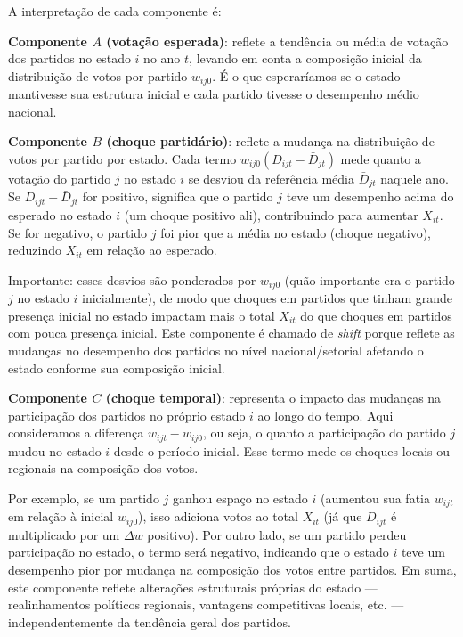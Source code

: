 \documentclass[
]{article}
\begin{document}
A interpretação de cada componente é:

\textbf{Componente \(A\) (votação esperada)}: reflete a tendência ou média de votação dos partidos no estado \(i\) no ano \(t\), levando em conta a composição inicial da distribuição de votos por partido \(w_{ij0}\). É o que esperaríamos se o estado mantivesse sua estrutura inicial e cada partido tivesse o desempenho médio nacional.

\textbf{Componente \(B\) (choque partidário)}: reflete a mudança na distribuição de votos por partido por estado. Cada termo \(w_{ij0}(D_{ijt} - \bar{D}_{jt})\) mede quanto a votação do partido \(j\) no estado \(i\) se desviou da referência média \(\bar{D}_{jt}\) naquele ano. Se \(D_{ijt} - \bar{D}_{jt}\) for positivo, significa que o partido \(j\) teve um desempenho acima do esperado no estado \(i\) (um choque positivo ali), contribuindo para aumentar \(X_{it}\). Se for negativo, o partido \(j\) foi pior que a média no estado (choque negativo), reduzindo \(X_{it}\) em relação ao esperado.

Importante: esses desvios são ponderados por \(w_{ij0}\) (quão importante era o partido \(j\) no estado \(i\) inicialmente), de modo que choques em partidos que tinham grande presença inicial no estado impactam mais o total \(X_{it}\) do que choques em partidos com pouca presença inicial. Este componente é chamado de \emph{shift} porque reflete as mudanças no desempenho dos partidos no nível nacional/setorial afetando o estado conforme sua composição inicial.

\textbf{Componente \(C\) (choque temporal)}: representa o impacto das mudanças na participação dos partidos no próprio estado \(i\) ao longo do tempo. Aqui consideramos a diferença \(w_{ijt} - w_{ij0}\), ou seja, o quanto a participação do partido \(j\) mudou no estado \(i\) desde o período inicial. Esse termo mede os choques locais ou regionais na composição dos votos.

Por exemplo, se um partido \(j\) ganhou espaço no estado \(i\) (aumentou sua fatia \(w_{ijt}\) em relação à inicial \(w_{ij0}\)), isso adiciona votos ao total \(X_{it}\) (já que \(D_{ijt}\) é multiplicado por um \(\Delta w\) positivo). Por outro lado, se um partido perdeu participação no estado, o termo será negativo, indicando que o estado \(i\) teve um desempenho pior por mudança na composição dos votos entre partidos. Em suma, este componente reflete alterações estruturais próprias do estado --- realinhamentos políticos regionais, vantagens competitivas locais, etc. --- independentemente da tendência geral dos partidos.
\end{document}
